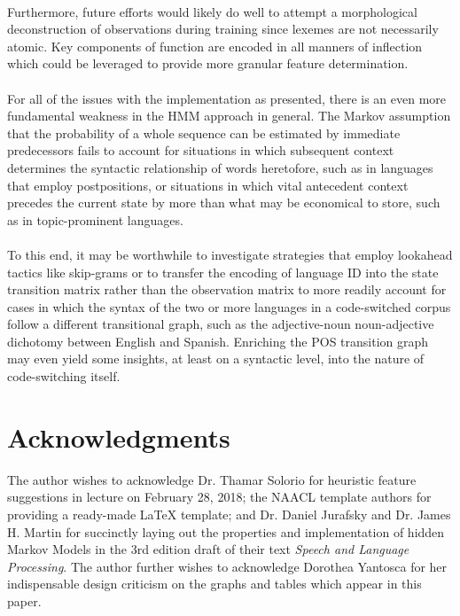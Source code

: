 \documentclass[11pt,a4paper]{article}
\begin{document}
\paragraph{}
Furthermore, future efforts would likely do well to attempt a morphological deconstruction
of observations during training since lexemes are not necessarily atomic. Key components
of function are encoded in all manners of inflection which could be leveraged to provide
more granular feature determination.

\paragraph{}
For all of the issues with the implementation as presented, there is an even more
fundamental weakness in the HMM approach in general. The Markov assumption that
the probability of a whole sequence can be estimated by immediate predecessors
fails to account for situations in which subsequent context determines the syntactic
relationship of words heretofore, such as in languages that employ postpositions,
or situations in which vital antecedent context precedes the current state by more
than what may be economical to store, such as in topic-prominent languages.

\paragraph{}
To this end, it may be worthwhile to investigate strategies that employ lookahead tactics
like skip-grams or to transfer the encoding of language ID into the state transition matrix
rather than the observation matrix to more readily account for cases in which the syntax of
the two or more languages in a code-switched corpus follow a different transitional graph,
such as the adjective-noun noun-adjective dichotomy between English and Spanish.
Enriching the POS transition graph may even yield some insights, at least on a syntactic
level, into the nature of code-switching itself.

\section*{Acknowledgments}

The author wishes to acknowledge Dr. Thamar Solorio for heuristic feature suggestions in
lecture on February 28, 2018; the NAACL template authors for providing a ready-made
{\LaTeX} template; and Dr. Daniel Jurafsky and Dr. James H. Martin for succinctly laying out the
properties and implementation of hidden Markov Models in the 3rd edition draft of their
text \emph{Speech and Language Processing}. The author further wishes to acknowledge
Dorothea Yantosca for her indispensable design criticism on the graphs and tables
which appear in this paper.
\end{document}
